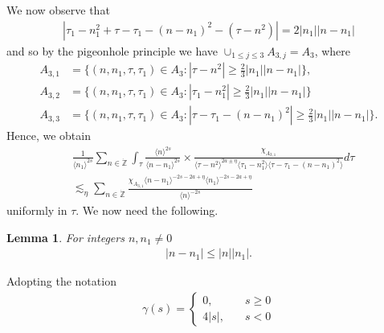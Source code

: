 \documentclass[12pt,reqno]{amsart}
\numberwithin{equation}{section}  %
\newcommand{\zz}{\mathbb{Z}}
\newcommand{\zzdot}{\dot{\zz}}
\newtheorem{lemma}[theorem]{Lemma}
\begin{document}
We now observe that
%
%
\begin{equation*}
\begin{split}
  | \tau_{1} - n_{1}^{2} + \tau - \tau_{1} - (n - n_{1})^{2} - (\tau - n^{2}) | = 2| n_{1} || n - n_{1} |
\end{split}
\end{equation*}
%
%
and so by the pigeonhole principle we have $\cup_{1 \le j \le 3} A_{3,j} = A_{3}$, where 
\begin{align*}
  A_{3,1}&=\{(n, n_1, \tau, \tau_1)\in A_3: |\tau-n^{2}|\ge \frac{2}{3} |n_{1}|| n - n_{1} |\},\\
  A_{3,2}&=\{(n, n_1, \tau, \tau_1)\in A_3: |\tau_{1}-n_{1}^2|\ge \frac{2}{3} |n_{1}||n - n_{1}| \}\\
  A_{3,3}&=\{(n, n_1, \tau, \tau_1)\in A_3: |\tau - \tau_{1}-(n - n_{1})^2|\ge \frac{2}{3} |n_{1}||n - n_{1}| \}.
\end{align*} 
%
%
Hence, we obtain
%
%
%
%
%
%
%
%
%
%
%
%
%
%
\begin{equation}
  \label{region-4-1}
\begin{split}
  &  \frac{1}{\langle n_{1} \rangle^{2s}} \sum_{n \in \zzdot} \int_{\tau} \frac{\langle n \rangle ^{2s}}{\langle n - n_{1}\rangle ^{2s}}  \times \frac{\chi_{A_{3,1}}}{\langle \tau - n^{2} \rangle^{2a \pm \eta} \langle
      \tau_{1} - n_{1}^{2} \rangle  \langle \tau - \tau_{1} - (n - n_{1})^{2} \rangle} d \tau
  \\
  &  \lesssim_{\eta} \sum_{n \in \zzdot} \frac{\chi_{A_{3,1}}\langle n - n_{1} \rangle ^{-2s-2a + \eta } \langle n_{1} \rangle ^{-2s-2a + \eta}}{\langle
    n\rangle ^{-2s}}
      \end{split}
\end{equation}
%
uniformly in $\tau$. We now need the following.
%
%
%
%
%
%
%
%
\begin{lemma}
  For integers $n, n_{1} \neq 0$
  \begin{equation*}
  \begin{split}
    | n - n_{1} | \le | n | | n_{1}|.
  \end{split}
  \end{equation*}
  \label{lem:key-trick}
\end{lemma}
%
%
%
%
%
%
%
Adopting the notation
  \begin{equation*}
  \begin{split}
  \gamma(s) = 
  \begin{cases} 0, \quad & s \ge 0
    \\
    4|s|, \quad & s < 0
  \end{cases}
\end{split}
  \end{equation*}
\end{document}
